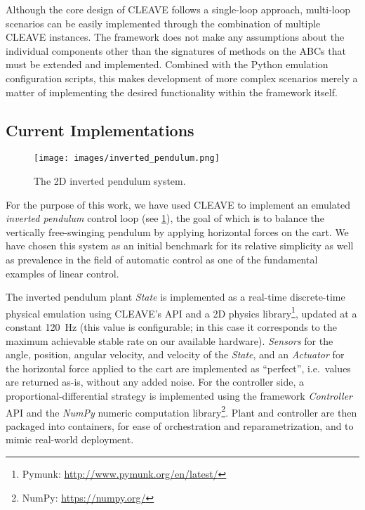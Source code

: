 Although the core design of \ac{CLEAVE} follows a single-loop approach, multi-loop scenarios can be easily implemented through the combination of multiple \ac{CLEAVE} instances.
The framework does not make any assumptions about the individual components other than the signatures of methods on the \acp{ABC} that must be extended and implemented.
Combined with the Python emulation configuration scripts, this makes development of more complex scenarios merely a matter of implementing the desired functionality within the framework itself.

\subsection{Current Implementations}

\begin{figure}
    \centering
    \texttt{[image: images/inverted\_pendulum.png]}
    \caption{
        The 2D inverted pendulum system.
    }\label{fig:invpend}
\end{figure}

For the purpose of this work, we have used \ac{CLEAVE} to implement an emulated \emph{inverted pendulum} control loop (see \cref{fig:invpend}), the goal of which is to balance the vertically free-swinging pendulum by applying horizontal forces on the cart.
We have chosen this system as an initial benchmark for its relative simplicity as well as prevalence in the field of automatic control as one of the fundamental examples of linear control.

The inverted pendulum plant \emph{State} is implemented as a real-time discrete-time physical emulation using CLEAVE's API and a 2D physics library\footnote{Pymunk: \url{http://www.pymunk.org/en/latest/}}, updated at a constant \SI{120}{\hertz} (this value is configurable; in this case it corresponds to the maximum achievable stable rate on our available hardware).
\emph{Sensors} for the angle, position, angular velocity, and velocity of the \emph{State}, and an \emph{Actuator} for the horizontal force applied to the cart are implemented as ``perfect'', i.e.\ values are returned as-is, without any added noise.
For the controller side, a proportional-differential strategy is implemented using the framework \emph{Controller} API and the \emph{NumPy} numeric computation library\footnote{NumPy: \url{https://numpy.org/}}.
Plant and controller are then packaged into containers, for ease of orchestration and reparametrization, and to mimic real-world deployment.


